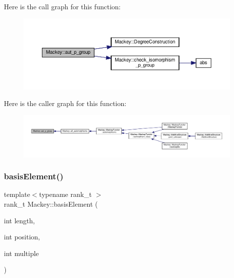 Here is the call graph for this function\+:\nopagebreak
\begin{figure}[H]
\begin{center}
\leavevmode
\includegraphics[width=350pt]{namespaceMackey_ab3832e52497b387d4553af06aa26ec99_cgraph}
\end{center}
\end{figure}
Here is the caller graph for this function\+:\nopagebreak
\begin{figure}[H]
\begin{center}
\leavevmode
\includegraphics[width=350pt]{namespaceMackey_ab3832e52497b387d4553af06aa26ec99_icgraph}
\end{center}
\end{figure}
\mbox{\label{namespaceMackey_ac2e368bf7d802f2fc47e39a71a5a1630}} 
\subsubsection{\texorpdfstring{basis\+Element()}{basisElement()}\hspace{0.1cm}{\footnotesize\ttfamily [1/2]}}
{\footnotesize\ttfamily template$<$typename rank\+\_\+t $>$ \\
rank\+\_\+t Mackey\+::basis\+Element (\begin{DoxyParamCaption}\item[{int}]{length,  }\item[{int}]{position,  }\item[{int}]{multiple }\end{DoxyParamCaption})\hspace{0.3cm}{\ttfamily [inline]}}



